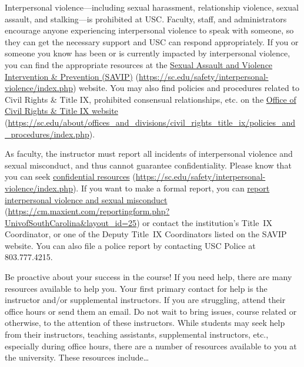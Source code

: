 \documentclass[11pt,letterpaper]{article}
\begin{document}

Interpersonal violence---including sexual harassment, relationship violence, sexual assault, and stalking---is prohibited at USC. Faculty, staff, and administrators encourage anyone experiencing interpersonal violence to speak with someone, so they can get the necessary support and USC can respond appropriately. If you or someone you know has been or is currently impacted by interpersonal violence, you can find the appropriate resources at the \href{https://sc.edu/safety/interpersonal-violence/index.php}{Sexual Assault and Violence Intervention \& Prevention (SAVIP)} (\url{https://sc.edu/safety/interpersonal-violence/index.php}) website. You may also find policies and procedures related to Civil Rights \& Title IX, prohibited consensual relationships, etc. on the \href{https://sc.edu/about/offices\_and\_divisions/civil\_rights\_title\_ix/policies\_and\_procedures/index.php}{Office of Civil Rights \& Title IX website} (\url{https://sc.edu/about/offices\_and\_divisions/civil\_rights\_title\_ix/policies\_and\_procedures/index.php}). \pspace

As faculty, the instructor must report all incidents of interpersonal violence and sexual misconduct, and thus cannot guarantee confidentiality. Please know that you can seek \href{https://sc.edu/safety/interpersonal-violence/index.php}{confidential resources} (\url{https://sc.edu/safety/interpersonal-violence/index.php}). If you want to make a formal report, you can \href{https://cm.maxient.com/reportingform.php?UnivofSouthCarolina\&layout\_id=25}{report interpersonal violence and sexual misconduct} (\url{https://cm.maxient.com/reportingform.php?UnivofSouthCarolina\&layout\_id=25}) or contact the institution's Title~IX Coordinator, or one of the Deputy Title~IX Coordinators listed on the SAVIP website. You can also file a police report by contacting USC Police at 803.777.4215. \sectionbreak




Be proactive about your success in the course! If you need help, there are many resources available to help you. Your first primary contact for help is the instructor and/or supplemental instructors. If you are struggling, attend their office hours or send them an email. Do not wait to bring issues, course related or otherwise, to the attention of these instructors. While students may seek help from their instructors, teaching assistants, supplemental instructors, etc., especially during office hours, there are a number of resources available to you at the university. These resources include\dots
\end{document}
